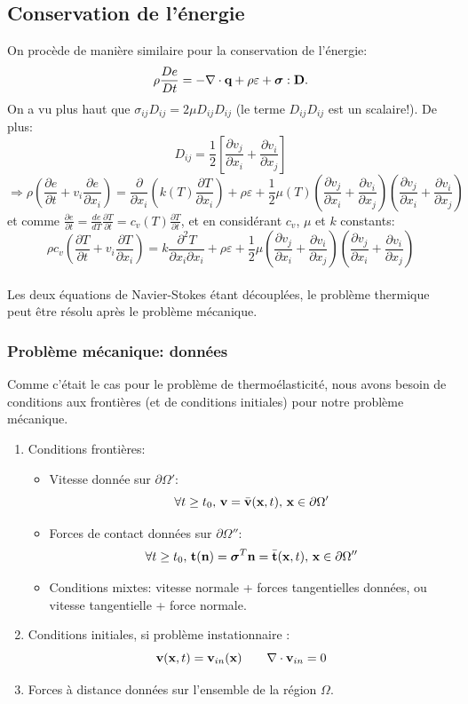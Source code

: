 \subsection*{Conservation de l'énergie}
On procède de manière similaire pour la conservation de l'énergie:
$$\rho\frac{De}{Dt}=-\nabla\cdot\textbf{q}+\rho\varepsilon+\boldsymbol{\sigma}:\textbf{D}.$$
On a vu plus haut que $\sigma_{ij}D_{ij}=2\mu D_{ij}D_{ij}$ (le terme $D_{ij}D_{ij}$ est un scalaire!). De plus:
$$D_{ij}=\frac{1}{2}\left[\frac{\partial v_j}{\partial x_i}+\frac{\partial v_i}{\partial x_j}\right]$$
$$\Rightarrow \rho\left(\frac{\partial e}{\partial t}+v_i\frac{\partial e}{\partial x_i}\right)=\frac{\partial}{\partial x_i}\left(k(T)\frac{\partial T}{\partial x_i}\right)+\rho\varepsilon+\frac{1}{2}\mu(T)\left(\frac{\partial v_j}{\partial x_i}+\frac{\partial v_i}{\partial x_j}\right)\left(\frac{\partial v_j}{\partial x_i}+\frac{\partial v_i}{\partial x_j}\right)$$
et comme $\frac{\partial e}{\partial t}=\frac{de}{dT}\frac{\partial T}{\partial t}=c_v(T)\frac{\partial T}{\partial t}$, et en considérant $c_v$, $\mu$ et $k$ constants:
$$\boxed{\rho c_v\left(\frac{\partial T}{\partial t}+v_i\frac{\partial T}{\partial x_i}\right)=k\frac{\partial^2 T}{\partial x_i\partial x_i}+\rho\varepsilon+\frac{1}{2}\mu\left(\frac{\partial v_j}{\partial x_i}+\frac{\partial v_i}{\partial x_j}\right)\left(\frac{\partial v_j}{\partial x_i}+\frac{\partial v_i}{\partial x_j}\right)}$$
\paragraph{}
Les deux équations de Navier-Stokes étant découplées, le problème thermique peut être résolu après le problème mécanique.
\subsubsection*{Problème mécanique: données}
Comme c'était le cas pour le problème de thermoélasticité, nous avons besoin de conditions aux frontières (et de conditions initiales) pour notre problème mécanique.
\begin{enumerate}
\item Conditions frontières:
	\begin{itemize}
	\item Vitesse donnée sur $\partial \Omega'$:
	 $$\forall t \geq t_0,\,\textbf{v}=\bar{\textbf{v}}(\textbf{x},t),\, \textbf{x}\in \partial \Omega'$$
	\item Forces de contact données sur $\partial\Omega''$:
	 $$\forall t \geq t_0,\,\textbf{t}(\textbf{n})=\boldsymbol{\sigma}^T\textbf{n}=\bar{\textbf{t}}(\textbf{x},t),\, \textbf{x}\in \partial \Omega''$$
	 \item Conditions mixtes: vitesse normale + forces tangentielles données, ou vitesse tangentielle + force normale.
	\end{itemize}
\item Conditions initiales, si problème instationnaire :
 $$\textbf{v}(\textbf{x},t)=\textbf{v}_{in}(\textbf{x})\qquad\nabla\cdot\textbf{v}_{in}=0$$
 \item Forces à distance données sur l'ensemble de la région $\Omega$.
\end{enumerate}
